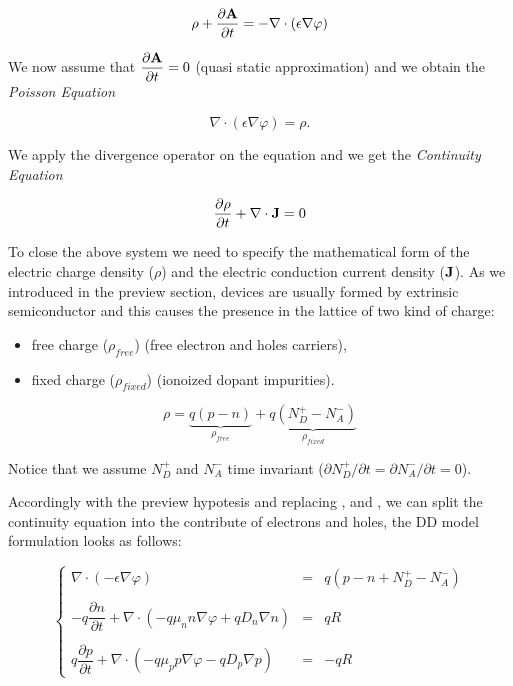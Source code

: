 \begin{equation}
\rho + \dfrac{\partial \mathbf{A}}{\partial t}  = -\nabla \cdot (\epsilon \nabla \varphi)
\end{equation}

We now assume that $\dfrac{\partial \mathbf{A}}{\partial t} = 0$ (quasi static approximation) and we obtain the \textit{Poisson Equation}

\begin{equation}
\label{eq: Poisson equation}
\nabla \cdot (\epsilon \nabla \varphi) = \rho.
\end{equation} 
	
	We apply the divergence operator on the equation   and we get the \textit{Continuity Equation}

\begin{equation}
\dfrac{\partial \rho}{\partial t} + \nabla \cdot \mathbf{J}  =  0 \end{equation} 




To close the above system we need to specify the mathematical form of the electric charge density ($\rho$) and the electric conduction current density ($\mathbf{J}$).
As we introduced in the preview section, devices are usually formed by extrinsic semiconductor and this causes the presence in the lattice of two kind of charge:

\begin{itemize}
\item free charge ($\rho_{free}$) (free electron and holes carriers),
\item fixed charge ($\rho_{fixed}$) (ionoized dopant impurities).
\end{itemize} 

\begin{equation}
\label{eq: charge balance}
\rho = \underbrace{q(p-n)}_{\rho_{free}} +\underbrace{q(N_D^+-N_A^-)}_{\rho_{fixed}}
\end{equation}

 Notice that we assume $N_D^+$ and $N_A^-$ time invariant ($\partial N_D^+ / \partial t=\partial N_A^- / \partial t = 0$).

 Accordingly with the preview hypotesis and replacing ,  and , we can split the continuity equation into the contribute of electrons and holes, the DD model formulation looks as follows:
 
\begin{equation}
\label{eq: full problem}
\left\{
\begin{array}{rcl}
\nabla \cdot (-\epsilon \nabla \varphi) & = & q(p-n+N_D^+-N_A^-)\\ \\
-q\dfrac{\partial n}{\partial t} + \nabla \cdot ( - q\mu_n n \nabla \varphi + qD_n \nabla n )& = & qR\\ \\
q\dfrac{\partial p}{\partial t} + \nabla \cdot (- q\mu_p p \nabla \varphi - qD_p \nabla p )& = & -qR 
\end{array}
\right.
\end{equation}

